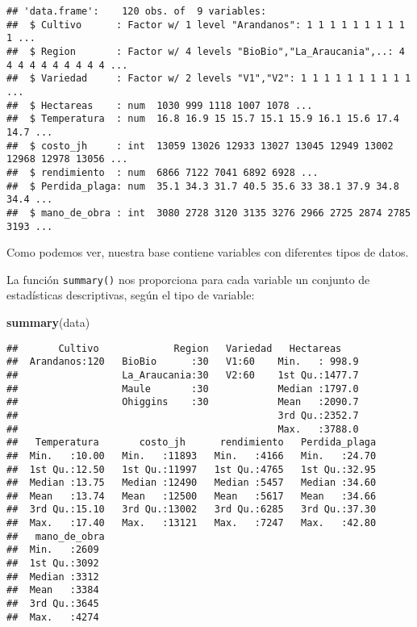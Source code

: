 \documentclass[]{book}
\newenvironment{Shaded}{\begin{snugshade}}{\end{snugshade}}
\newcommand{\KeywordTok}[1]{\textcolor[rgb]{0.13,0.29,0.53}{\textbf{#1}}}
\newcommand{\NormalTok}[1]{#1}
\begin{document}
\begin{verbatim}
## 'data.frame':    120 obs. of  9 variables:
##  $ Cultivo      : Factor w/ 1 level "Arandanos": 1 1 1 1 1 1 1 1 1 1 ...
##  $ Region       : Factor w/ 4 levels "BioBio","La_Araucania",..: 4 4 4 4 4 4 4 4 4 4 ...
##  $ Variedad     : Factor w/ 2 levels "V1","V2": 1 1 1 1 1 1 1 1 1 1 ...
##  $ Hectareas    : num  1030 999 1118 1007 1078 ...
##  $ Temperatura  : num  16.8 16.9 15 15.7 15.1 15.9 16.1 15.6 17.4 14.7 ...
##  $ costo_jh     : int  13059 13026 12933 13027 13045 12949 13002 12968 12978 13056 ...
##  $ rendimiento  : num  6866 7122 7041 6892 6928 ...
##  $ Perdida_plaga: num  35.1 34.3 31.7 40.5 35.6 33 38.1 37.9 34.8 34.4 ...
##  $ mano_de_obra : int  3080 2728 3120 3135 3276 2966 2725 2874 2785 3193 ...
\end{verbatim}

Como podemos ver, nuestra base contiene variables con diferentes tipos de datos.

La función \texttt{summary()} nos proporciona para cada variable un conjunto de estadísticas descriptivas, según el tipo de variable:

\begin{Shaded}
\begin{Highlighting}[]
\KeywordTok{summary}\NormalTok{(data)}
\end{Highlighting}
\end{Shaded}

\begin{verbatim}
##       Cultivo             Region   Variedad   Hectareas     
##  Arandanos:120   BioBio      :30   V1:60    Min.   : 998.9  
##                  La_Araucania:30   V2:60    1st Qu.:1477.7  
##                  Maule       :30            Median :1797.0  
##                  Ohiggins    :30            Mean   :2090.7  
##                                             3rd Qu.:2352.7  
##                                             Max.   :3788.0  
##   Temperatura       costo_jh      rendimiento   Perdida_plaga  
##  Min.   :10.00   Min.   :11893   Min.   :4166   Min.   :24.70  
##  1st Qu.:12.50   1st Qu.:11997   1st Qu.:4765   1st Qu.:32.95  
##  Median :13.75   Median :12490   Median :5457   Median :34.60  
##  Mean   :13.74   Mean   :12500   Mean   :5617   Mean   :34.66  
##  3rd Qu.:15.10   3rd Qu.:13002   3rd Qu.:6285   3rd Qu.:37.30  
##  Max.   :17.40   Max.   :13121   Max.   :7247   Max.   :42.80  
##   mano_de_obra 
##  Min.   :2609  
##  1st Qu.:3092  
##  Median :3312  
##  Mean   :3384  
##  3rd Qu.:3645  
##  Max.   :4274
\end{verbatim}
\end{document}
